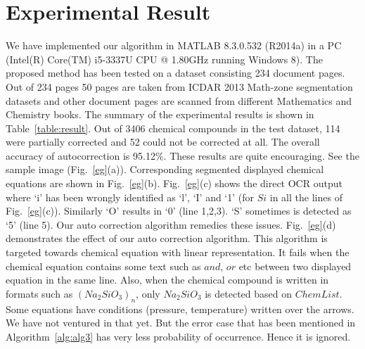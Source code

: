\documentclass[conference]{IEEEtran}
\begin{document}
\section{Experimental Result}
We have implemented our algorithm in MATLAB 8.3.0.532
(R2014a) in a PC (Intel(R) Core(TM) i5-3337U CPU @ 1.80GHz
running Windows 8). The proposed method has been tested on
a dataset consisting 234 document pages. Out of 234 pages 50
pages are taken from ICDAR 2013 Math-zone segmentation
datasets and other document pages are scanned from different Mathematics and
Chemistry books. 
The summary of the experimental results
is shown in Table~\ref{table:result}. Out of 3406 chemical compounds in the test dataset, 114 were partially corrected and 52 could not be corrected at all. The overall accuracy of autocorrection is 95.12\%. These results are quite encouraging. See the sample image (Fig.~\ref{eg}(a)). Corresponding segmented displayed chemical equations are shown in Fig.~\ref{eg}(b). Fig.~\ref{eg}(c) shows the direct OCR output where `i' has been wrongly identified as `l', `I' and `1' (for $Si$ in all the lines of  Fig.~\ref{eg}(c)). Similarly `O' results in `0' (line 1,2,3). `S' sometimes is detected as `5' (line 5). Our auto correction algorithm remedies these issues. Fig.~\ref{eg}(d) demonstrates the effect of our auto correction algorithm. This algorithm is targeted towards chemical equation with linear representation.
It fails when the chemical equation contains some text such as $and$, $or$ etc between two displayed equation in the same line. Also, when the chemical compound is written in formats such as $(Na_2SiO_3)_n$, only $Na_2SiO_3$ is detected based on $ChemList$. Some equations have conditions (pressure, temperature) written over the arrows. We have not ventured in that yet. But the error case that has been mentioned in Algorithm~\ref{alg:alg3} has very less probability of occurrence. Hence it is ignored.
\end{document}
